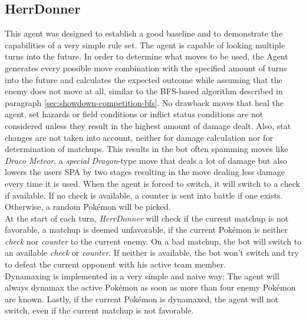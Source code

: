 \subsection{HerrDonner}
This agent was designed to establish a good baseline and to demonstrate the capabilities of a very
simple rule set. The agent is capable of looking multiple turns into the future. In order to determine
what moves to be used, the Agent generates every possible move combination with the specified amount
of turns into the future and calculates the expected outcome while assuming that the enemy does 
not move at all, similar to the \ac{BFS}-based algorithm described in paragraph \ref{sec:showdown-competition-bfs}. 
No drawback moves that heal the agent, set hazards or field conditions or inflict status conditions
are not considered unless they result in the highest amount of damage dealt. Also, stat changes are 
not taken into account, neither for damage calculation nor for determination of matchups. 
This results in the bot often spamming moves like \textit{Draco Meteor}, a \textit{special} 
\textit{Dragon}-type move that deals a lot of damage but also lowers the
users \ac{SPA} by two stages resulting in the move dealing less damage every time it is used. 
When the agent is forced to switch, it will switch to a check if available. If no check is available,
a counter is sent into battle if one exists. Otherwise, a random Pokémon will be picked. \\
At the start of each turn, \textit{HerrDonner} will check if the current matchup is not favorable, 
a matchup is deemed unfavorable, if the current Pokémon is neither \textit{check} nor 
\textit{counter} to the current enemy. On a bad matchup, the bot will switch to an available 
\textit{check} or \textit{counter}. If neither is available, the bot won't switch and try to
defeat the current opponent with his active team member. \\
Dynamaxing is implemented in a very simple and naive way: The agent will always dynamax the
active Pokémon as soon as more than four enemy Pokémon are known. Lastly, if the
current Pokémon is dynamaxed, the agent will not switch, even if the current matchup is not
favorable. 

